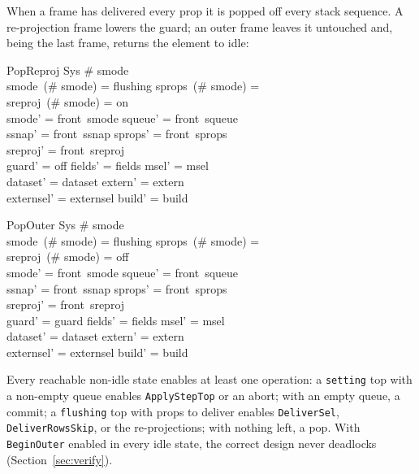 \documentclass[a4paper,10pt,fleqn]{article}
\begin{document}
When a frame has delivered every prop it is popped off every stack sequence.  A
re-projection frame lowers the guard; an outer frame leaves it untouched and,
being the last frame, returns the element to idle:

\begin{schema}{PopReproj}
  \Delta Sys
\where
  \# smode  \\
  smode~(\# smode) = flushing \land sprops~(\# smode) = \emptyset \\
  sreproj~(\# smode) = on \\
  smode' = front~smode \land squeue' = front~squeue \\
  \land ssnap' = front~ssnap \land sprops' = front~sprops \\
  \land sreproj' = front~sreproj \\
  guard' = off \land fields' = fields \land msel' = msel \\
  \land dataset' = dataset \land extern' = extern \\
  \land externsel' = externsel \land build' = build
\end{schema}

\begin{schema}{PopOuter}
  \Delta Sys
\where
  \# smode  \\
  smode~(\# smode) = flushing \land sprops~(\# smode) = \emptyset \\
  sreproj~(\# smode) = off \\
  smode' = front~smode \land squeue' = front~squeue \\
  \land ssnap' = front~ssnap \land sprops' = front~sprops \\
  \land sreproj' = front~sreproj \\
  guard' = guard \land fields' = fields \land msel' = msel \\
  \land dataset' = dataset \land extern' = extern \\
  \land externsel' = externsel \land build' = build
\end{schema}

Every reachable non-idle state enables at least one operation: a \texttt{setting}
top with a non-empty queue enables \texttt{ApplyStepTop} or an abort; with an
empty queue, a commit; a \texttt{flushing} top with props to deliver enables
\texttt{DeliverSel}, \texttt{DeliverRowsSkip}, or the re-projections; with nothing
left, a pop.  With \texttt{BeginOuter} enabled in every idle state, the correct
design never deadlocks (Section~\ref{sec:verify}).
\end{document}
